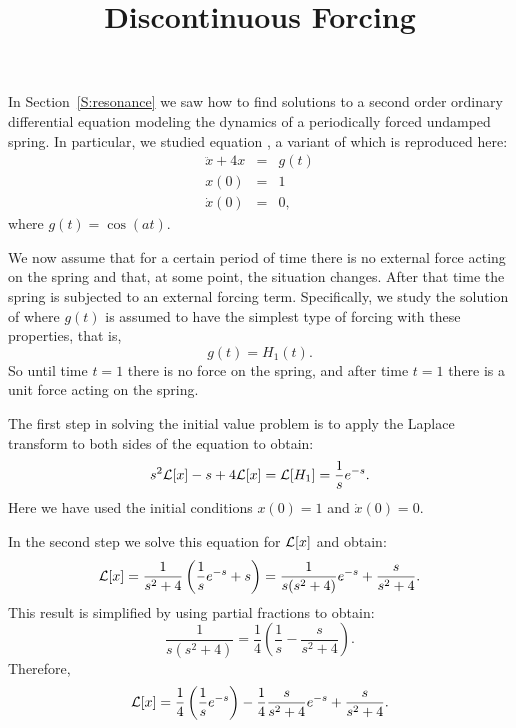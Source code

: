 \documentclass{ximera}
\title{Discontinuous Forcing}
\begin{document}
\begin{abstract}
\end{abstract}
\maketitle

 \label{S:13.4}


In Section~\ref{S:resonance} we saw how to find solutions to a second 
order ordinary differential equation modeling the dynamics of a periodically
forced undamped spring.  
In particular, we studied equation , a variant of 
which is reproduced here:
\begin{equation}  \label{eq:ivH1}
\begin{array}{rcl}
   \ddot{x} + 4x & = & g(t) \\
    x(0) & = & 1 \\
    \dot{x}(0) & = & 0,
\end{array}
\end{equation}
where $g(t)=\cos(at)$.

We now assume that for a certain period of time there is no external 
force
acting on the spring and that, at some point, the situation changes. 
After that time the spring is subjected to an external forcing term.  
Specifically, we study the solution of  where $g(t)$ is 
assumed to have the simplest type of forcing with these properties, 
that is,  
\begin{equation}  \label{eq:Heavy1}
g(t) = H_1(t). 
\end{equation}
So until time $t=1$ there is no force on the spring, and after time $t=1$
there is a unit force acting on the spring.

The first step in solving the initial value problem  is to 
apply the Laplace transform to both sides of the equation to obtain:
\[
s^2{\cal L}[x]-s + 4{\cal L}[x] = {\cal L}[H_1] = \frac{1}{s}e^{-s}.
\]
Here we have used the initial conditions $x(0)=1$ and $\dot{x}(0)=0$.

In the second step we solve this equation for ${\cal L}[x]$ and obtain: 
\[
{\cal L}[x] = \frac{1}{s^2+4}\left( \frac{1}{s}e^{-s}+s\right)
=\frac{1}{s(s^2+4)}e^{-s}+\frac{s}{s^2+4}.
\]
This result is simplified by using partial fractions to obtain:
\[
\frac{1}{s(s^2+4)}=\frac{1}{4}\left(\frac{1}{s}-\frac{s}{s^2+4}\right).
\]
Therefore,
\[
{\cal L}[x] = \frac{1}{4}\left(\frac{1}{s}e^{-s}\right) -
\frac{1}{4}\frac{s}{s^2+4}e^{-s} + \frac{s}{s^2+4}.
\]
\end{document}
